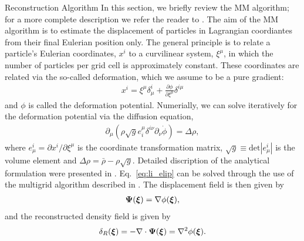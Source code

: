 \begin{section}{Reconstruction Algorithm}
  \label{sec:reconstruction}
  In this section, we briefly review the MM algorithm; for a more
  complete description we refer the reader to \cite{bib:ZhuH2016}.  
  The aim of the MM algorithm is to estimate the displacement of particles in 
  Lagrangian coordiantes from their final Eulerian position only. The
  general principle is to relate a particle's Eulerian coordinates, $x^i$ to
  a curvilinear system, $\xi^\mu$, in which the number of particles
  per grid cell is approximately constant.  These coordinates are
  related via the so-called deformation, which we assume to be a pure
  gradient:
  \begin{align}
    x^i = \xi^\mu \delta^i_\mu + \frac{\partial \phi}{\partial
    \xi^\mu}\delta^{i\mu}
  \end{align}
  and $\phi$ is called the deformation potential.  Numerially, we 
  can solve iteratively for
  the deformation potential via the diffusion equation, 
  \begin{align}
    \label{eq:li_elip}
    \partial _\mu (\rho \sqrt{g} e^\mu _i \delta^{i\nu}
    \partial_\nu \dot{\phi})=\Delta \rho,
  \end{align}
  where $e^i_\mu = \partial x^i / \partial \xi ^ \mu$ is the
  coordinate transformation matrix,
  $\sqrt{g} \equiv \mathrm{det}\left| e^i_\mu\right|$ is the volume
  element and $\Delta \rho = \bar{\rho}-\rho \sqrt{g}$. Detailed discription 
  of the analytical formulation were presented in \cite{bib:Pen1995,bib:Pen1998}.
  Eq.~\ref{eq:li_elip} can be solved through the use of the multigrid
  algorithm described in \cite{bib:Pen1995,bib:Pen1998,bib:ZhuH2016}.
  The displacement field is then given by
  \begin{align}
   \label{eq:disp}
   \boldsymbol{\Psi}(\boldsymbol{\xi})=\nabla \phi(\boldsymbol{\xi}),
  \end{align}
  and the reconstructed density field is given by
  \begin{align}
   \label{eq:delta}
   \delta_R(\boldsymbol{\xi})=- \nabla \cdot \boldsymbol{\Psi}(\boldsymbol{\xi}) = \nabla^2 \phi(\boldsymbol{\xi}). 
  \end{align}

\end{section}

